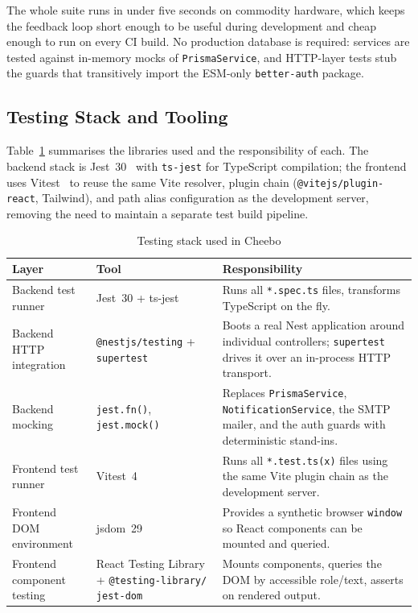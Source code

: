 \documentclass[12pt, a4paper, oneside]{report}
\begin{document}
The whole suite runs in under five seconds on commodity hardware,
which keeps the feedback loop short enough to be useful during
development and cheap enough to run on every CI build. No production
database is required: services are tested against in-memory mocks of
\texttt{PrismaService}, and HTTP-layer tests stub the guards that
transitively import the ESM-only \texttt{better-auth} package.

\subsection{Testing Stack and Tooling}

Table~\ref{tab:test-stack} summarises the libraries used and the
responsibility of each. The backend stack is Jest~30~\cite{jest} with
\texttt{ts-jest} for TypeScript compilation; the frontend uses
Vitest~\cite{vitest}
to reuse the same Vite resolver, plugin chain (\texttt{@vitejs/plugin-react},
Tailwind), and path alias configuration as the development server,
removing the need to maintain a separate test build pipeline.

\begin{table}[H]
\centering
\small
\setlength{\tabcolsep}{8pt}
\setlength{\extrarowheight}{3pt}
\renewcommand{\arraystretch}{1.4}
\begin{tabular}{|>{\raggedright\arraybackslash}p{3.5cm}|>{\raggedright\arraybackslash}p{3.5cm}|>{\raggedright\arraybackslash}p{6.5cm}|}
\hline
\rowcolor{cheebolightgray}
\textbf{Layer} & \textbf{Tool} & \textbf{Responsibility} \\
\hline
Backend test runner & Jest~30 + ts-jest & Runs all \texttt{*.spec.ts} files, transforms TypeScript on the fly. \\
\hline
Backend HTTP integration & \texttt{@nestjs/testing} + \texttt{supertest} & Boots a real Nest application around individual controllers; \texttt{supertest} drives it over an in-process HTTP transport. \\
\hline
Backend mocking & \texttt{jest.fn()}, \texttt{jest.mock()} & Replaces \texttt{PrismaService}, \texttt{NotificationService}, the SMTP mailer, and the auth guards with deterministic stand-ins. \\
\hline
Frontend test runner & Vitest~4 & Runs all \texttt{*.test.ts(x)} files using the same Vite plugin chain as the development server. \\
\hline
Frontend DOM environment & jsdom~29 & Provides a synthetic browser \texttt{window} so React components can be mounted and queried. \\
\hline
Frontend component testing & React Testing Library + \texttt{@testing-library/
jest-dom} & Mounts components, queries the DOM by accessible role/text, asserts on rendered output. \\
\hline
\end{tabular}
\caption{Testing stack used in Cheebo}
\label{tab:test-stack}
\end{table}
\end{document}
